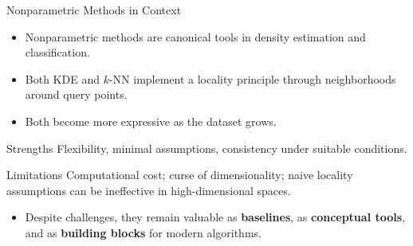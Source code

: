 \begin{frame}{Nonparametric Methods in Context}
  \begin{itemize}
    \item Nonparametric methods are \alert{canonical tools} in density estimation and classification.
    \item Both KDE and $k$-NN implement a locality principle through neighborhoods around query points.
    \item Both become more expressive as the dataset grows.
  \end{itemize}
  \vspace{0.4em}
  \begin{block}{Strengths}
    Flexibility, minimal assumptions, consistency under suitable conditions.
  \end{block}
  \vspace{0.3em}
  \begin{alertblock}{Limitations}
    Computational cost; curse of dimensionality; naive locality assumptions can be ineffective in high-dimensional spaces.
  \end{alertblock}
  \vspace{0.3em}
  \begin{itemize}
    \item Despite challenges, they remain valuable as \textbf{baselines}, as \textbf{conceptual tools}, and as \textbf{building blocks} for modern algorithms.
  \end{itemize}
\end{frame}

%
